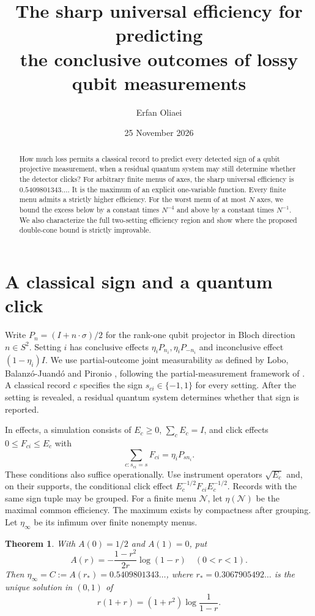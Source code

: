 \documentclass[11pt,a4paper]{article}
\title{The sharp universal efficiency for predicting\protect\\ the conclusive outcomes of lossy qubit measurements}
\author{Erfan Oliaei}
\date{25 November 2026}
\newtheorem{theorem}{Theorem}
\theoremstyle{remark}
\begin{document}
\maketitle
\begin{abstract}
How much loss permits a classical record to predict every detected sign of a qubit projective measurement, when a residual quantum system may still determine whether the detector clicks? For arbitrary finite menus of axes, the sharp universal efficiency is \(0.5409801343\ldots\). It is the maximum of an explicit one-variable function. Every finite menu admits a strictly higher efficiency. For the worst menu of at most \(N\) axes, we bound the excess below by a constant times \(N^{-4}\) and above by a constant times \(N^{-1}\). We also characterize the full two-setting efficiency region and show where the proposed double-cone bound is strictly improvable.
\end{abstract}

\section{A classical sign and a quantum click}

Write \(P_n=(I+n\cdot\sigma)/2\) for the rank-one qubit projector in Bloch direction \(n\in S^2\). Setting \(i\) has conclusive effects \(\eta_iP_{n_i},\eta_iP_{-n_i}\) and inconclusive effect \((1-\eta_i)I\). We use partial-outcome joint measurability as defined by Lobo, Balanz\'o-Juand\'o and Pironio \cite[Def.~2 and Sec.~IV.B(c)]{LBP}, following the partial-measurement framework of \cite{Masini}. A classical record \(c\) specifies the sign \(s_{ci}\in\{-1,1\}\) for every setting. After the setting is revealed, a residual quantum system determines whether that sign is reported.

In effects, a simulation consists of \(E_c\ge0\), \(\sum_c E_c=I\), and click effects \(0\le F_{ci}\le E_c\) with
\[
        \sum_{c:s_{ci}=s}F_{ci}=\eta_iP_{s n_i}.
\]
These conditions also suffice operationally. Use instrument operators \(\sqrt{E_c}\) and, on their supports, the conditional click effect \(E_c^{-1/2}F_{ci}E_c^{-1/2}\). Records with the same sign tuple may be grouped. For a finite menu \(\mathcal N\), let \(\eta(\mathcal N)\) be the maximal common efficiency. The maximum exists by compactness after grouping. Let \(\eta_\infty\) be its infimum over finite nonempty menus.

\begin{theorem}\label{univ}
With \(A(0)=1/2\) and \(A(1)=0\), put
\[
 A(r)=-\frac{1-r^2}{2r}\log(1-r)\quad (0<r<1).
\]
Then \(\eta_\infty=C:=A(r_*)=0.5409801343\ldots\), where \(r_*=0.3067905492\ldots\) is the unique solution in \((0,1)\) of
\[
                 r(1+r)=(1+r^2)\log\frac1{1-r}.
\]
\end{theorem}
\end{document}
